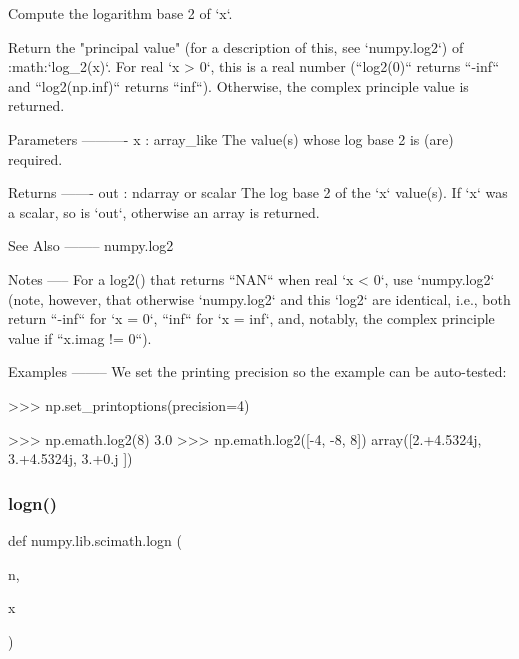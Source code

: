 \begin{DoxyVerb}Compute the logarithm base 2 of `x`.

Return the "principal value" (for a description of this, see
`numpy.log2`) of :math:`log_2(x)`. For real `x > 0`, this is
a real number (``log2(0)`` returns ``-inf`` and ``log2(np.inf)`` returns
``inf``). Otherwise, the complex principle value is returned.

Parameters
----------
x : array_like
   The value(s) whose log base 2 is (are) required.

Returns
-------
out : ndarray or scalar
   The log base 2 of the `x` value(s). If `x` was a scalar, so is `out`,
   otherwise an array is returned.

See Also
--------
numpy.log2

Notes
-----
For a log2() that returns ``NAN`` when real `x < 0`, use `numpy.log2`
(note, however, that otherwise `numpy.log2` and this `log2` are
identical, i.e., both return ``-inf`` for `x = 0`, ``inf`` for `x = inf`,
and, notably, the complex principle value if ``x.imag != 0``).

Examples
--------
We set the printing precision so the example can be auto-tested:

>>> np.set_printoptions(precision=4)

>>> np.emath.log2(8)
3.0
>>> np.emath.log2([-4, -8, 8])
array([2.+4.5324j, 3.+4.5324j, 3.+0.j    ])\end{DoxyVerb}
 \mbox{\label{namespacenumpy_1_1lib_1_1scimath_ada5a76e9576694ac6135decd9456937b}} 
\subsubsection{\texorpdfstring{logn()}{logn()}}
{\footnotesize\ttfamily def numpy.\+lib.\+scimath.\+logn (\begin{DoxyParamCaption}\item[{}]{n,  }\item[{}]{x }\end{DoxyParamCaption})}

